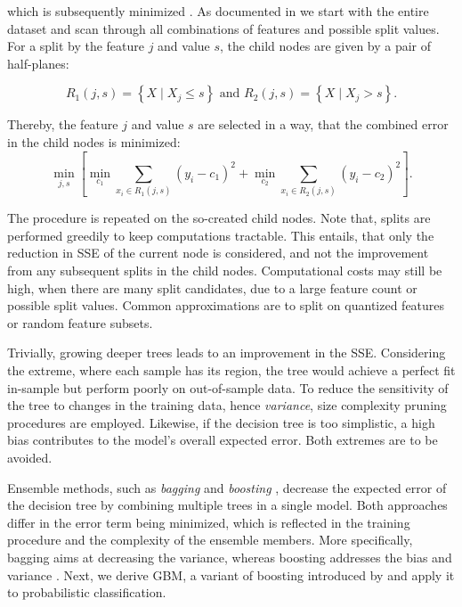 which is subsequently minimized \textcite[][231]{breimanClassificationRegressionTrees2017}. As documented in \textcite[][326]{hastietrevorElementsStatisticalLearning2009} we start with the entire dataset and scan through all combinations of features and possible split values. For a split by the feature $j$ and value $s$, the child nodes are given by a pair of half-planes:

\begin{equation}
R_1(j, s)=\left\{X \mid X_j \leq s\right\} \text { and } R_2(j, s)=\left\{X \mid X_j>s\right\}.
\end{equation}

Thereby, the feature $j$ and value $s$ are selected in a way, that the combined error in the child nodes is minimized:
\begin{equation}
\min _{j, s}\left[\min _{c_1} \sum_{x_i \in R_1(j, s)}\left(y_i-c_1\right)^2+\min _{c_2} \sum_{x_i \in R_2(j, s)}\left(y_i-c_2\right)^2\right].
\end{equation}

The procedure is repeated on the so-created child nodes. Note that, splits are performed greedily to keep computations tractable. This entails, that only the reduction in \gls{SSE} of the current node is considered, and not the improvement from any subsequent splits in the child nodes. Computational costs may still be high, when there are many split candidates, due to a large feature count or possible split values. Common approximations are to split on quantized features or random feature subsets.

Trivially, growing deeper trees leads to an improvement in the \gls{SSE}. Considering the extreme, where each sample has its region, the tree would achieve a perfect fit in-sample but perform poorly on out-of-sample data. To reduce the sensitivity of the tree to changes in the training data, hence \emph{variance}, size complexity pruning procedures are employed. Likewise, if the decision tree is too simplistic, a high bias contributes to the model's overall expected error. Both extremes are to be avoided.

Ensemble methods, such as \emph{bagging} \autocite[][123]{breimanBaggingPredictors1996} and \emph{boosting} \autocite[][197--227]{schapireStrengthWeakLearnability1990}, decrease the expected error of the decision tree by combining multiple trees in a single model. Both approaches differ in the error term being minimized, which is reflected in the training procedure and the complexity of the ensemble members. More specifically, bagging aims at decreasing the variance, whereas boosting addresses the bias and variance \autocites[][1672]{schapireBoostingMarginNew1998}[][29]{breimanRandomForests2001}. Next, we derive \gls{GBM}, a variant of boosting introduced by \textcite[][9]{friedmanGreedyFunctionApproximation2001} and apply it to probabilistic classification.


